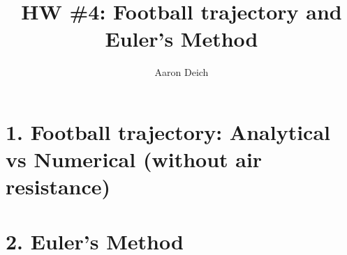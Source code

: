 \documentclass{article}
\begin{document}
\title{HW \#4: Football trajectory and Euler's Method}
\author{Aaron Deich}

\maketitle

\section{1. Football trajectory: Analytical vs Numerical (without air resistance)}

\section{2. Euler's Method}




\end{document}
